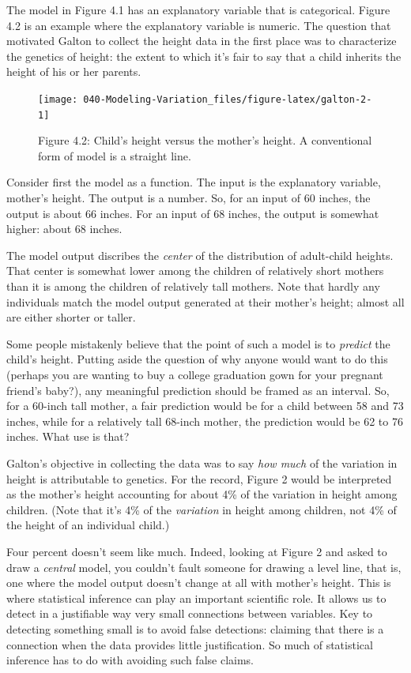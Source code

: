 \documentclass[]{tufte-book}
\begin{document}
The model in Figure 4.1 has an explanatory variable that is categorical. Figure 4.2 is an example where the explanatory variable is numeric. The question that motivated Galton to collect the height data in the first place was to characterize the genetics of height: the extent to which it's fair to say that a child inherits the height of his or her parents.

\begin{figure}\texttt{[image: 040-Modeling-Variation\_files/figure-latex/galton-2-1]} \caption[Figure 4.2]{Figure 4.2:  Child's height versus the mother's height. A conventional form of model is a straight line.}\label{fig:galton-2}
\end{figure}

Consider first the model as a function. The input is the explanatory variable, mother's height. The output is a number. So, for an input of 60 inches, the output is about 66 inches. For an input of 68 inches, the output is somewhat higher: about 68 inches.

The model output discribes the \emph{center} of the distribution of adult-child heights. That center is somewhat lower among the children of relatively short mothers than it is among the children of relatively tall mothers. Note that hardly any individuals match the model output generated at their mother's height; almost all are either shorter or taller.

Some people mistakenly believe that the point of such a model is to \emph{predict} the child's height. Putting aside the question of why anyone would want to do this (perhaps you are wanting to buy a college graduation gown for your pregnant friend's baby?), any meaningful prediction should be framed as an interval. So, for a 60-inch tall mother, a fair prediction would be for a child between 58 and 73 inches, while for a relatively tall 68-inch mother, the prediction would be 62 to 76 inches. What use is that?

Galton's objective in collecting the data was to say \emph{how much} of the variation in height is attributable to genetics. For the record, Figure 2 would be interpreted as the mother's height accounting for about 4\% of the variation in height among children. (Note that it's 4\% of the \emph{variation} in height among children, not 4\% of the height of an individual child.)

Four percent doesn't seem like much. Indeed, looking at Figure 2 and asked to draw a \emph{central} model, you couldn't fault someone for drawing a level line, that is, one where the model output doesn't change at all with mother's height. This is where statistical inference can play an important scientific role. It allows us to detect in a justifiable way very small connections between variables. Key to detecting something small is to avoid false detections: claiming that there is a connection when the data provides little justification. So much of statistical inference has to do with avoiding such false claims.
\end{document}
